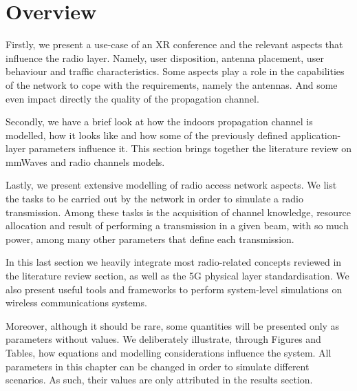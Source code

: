 \section*{Overview}


Firstly, we present a use-case of an XR conference and the relevant aspects that influence the radio layer. Namely, user disposition, antenna placement, user behaviour and traffic characteristics. Some aspects play a role in the 
capabilities of the network to cope with the requirements, namely the antennas. And some even impact directly the quality of the propagation channel.

Secondly, we have a brief look at how the indoors propagation channel is modelled, how it looks like and how some of the previously defined application-layer parameters influence it. This section brings together the literature review on mmWaves and radio channels models.


Lastly, we present extensive modelling of radio access network aspects. We list the tasks to be carried out by the network in order to simulate a radio transmission. Among these tasks is the acquisition of channel knowledge, resource allocation and result of performing a transmission in a given beam, with so much power, among many other parameters that define each transmission.

In this last section we heavily integrate most radio-related concepts reviewed in the literature review section, as well as the 5G physical layer standardisation. We also present useful tools and frameworks to perform system-level simulations on wireless communications systems.


Moreover, although it should be rare, some quantities will be presented only as parameters without values. We deliberately illustrate, through Figures and Tables, how equations and modelling considerations influence the system. All parameters in this chapter can be changed in order to simulate different scenarios. As such, their values are only attributed in the results section.